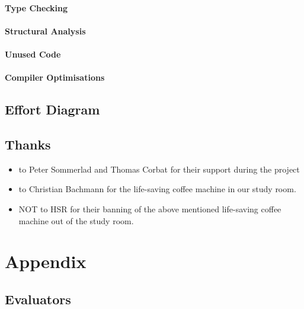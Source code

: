 \documentclass[12pt,halfparskip,DIV11,BCOR10mm]{scrreprt}
\begin{document}
\subsubsection{Type Checking}
\subsubsection{Structural Analysis}
\subsubsection{Unused Code}
\subsubsection{Compiler Optimisations}

\clearpage

\section{Effort Diagram}

\clearpage

\section{Thanks}

\begin{itemize}
    \item to Peter Sommerlad and Thomas Corbat for their support during the project
    \item to Christian Bachmann for the life-saving coffee machine in our study room. 
    \item NOT to HSR for their banning of the above mentioned life-saving coffee machine out of the study room.
\end{itemize}



\setcounter{secnumdepth}{-1}
\chapter{Appendix}

\section{Evaluators}
\end{document}
